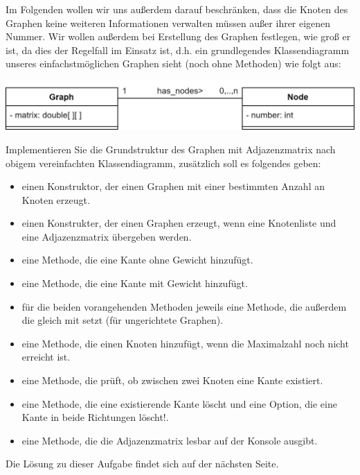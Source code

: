 \documentclass{article}
\begin{document}
Im Folgenden wollen wir uns außerdem darauf beschränken, dass die Knoten des Graphen keine weiteren Informationen verwalten müssen außer ihrer eigenen Nummer. Wir wollen außerdem bei Erstellung des Graphen festlegen, wie groß er ist, da dies der Regelfall im Einsatz ist, d.h. ein grundlegendes Klassendiagramm unseres einfachstmöglichen Graphen sieht (noch ohne Methoden) wie folgt aus: 
\begin{center}
    \includegraphics[scale=0.2]{../media/graph_basic.png}
\end{center}
\begin{task}{1}
Implementieren Sie die Grundstruktur des Graphen mit Adjazenzmatrix nach obigem vereinfachten Klassendiagramm, zusätzlich soll es folgendes geben: 
\begin{itemize}
    \item einen Konstruktor, der einen Graphen mit einer bestimmten Anzahl an Knoten erzeugt. 
    \item einen Konstrukter, der einen Graphen erzeugt, wenn eine Knotenliste und eine Adjazenzmatrix übergeben werden.
    \item eine Methode, die eine Kante ohne Gewicht hinzufügt.
    \item eine Methode, die eine Kante mit Gewicht hinzufügt.
    \item für die beiden vorangehenden Methoden jeweils eine Methode, die außerdem die  gleich mit setzt (für ungerichtete Graphen).
    \item eine Methode, die einen Knoten hinzufügt, wenn die Maximalzahl noch nicht erreicht ist.
    \item eine Methode, die prüft, ob zwischen zwei Knoten eine Kante existiert.
    \item eine Methode, die eine existierende Kante löscht und eine Option, die eine Kante in beide Richtungen löscht!.
    \item eine Methode, die die Adjazenzmatrix lesbar auf der Konsole ausgibt. 
\end{itemize}
\end{task}
Die Lösung zu dieser Aufgabe findet sich auf der nächsten Seite.


\newpage
\end{document}
